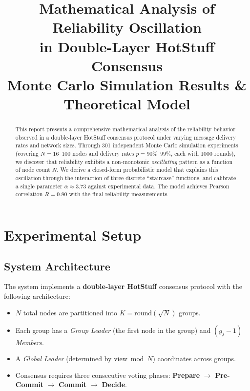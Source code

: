 \documentclass[12pt,a4paper]{article}
\title{%
  \textbf{Mathematical Analysis of Reliability Oscillation\\
  in Double-Layer HotStuff Consensus}\\[0.5em]
  \large Monte Carlo Simulation Results \& Theoretical Model
}
\author{}
\date{}
\begin{document}
\maketitle

\begin{abstract}
This report presents a comprehensive mathematical analysis of the reliability behavior observed in a double-layer HotStuff consensus protocol under varying message delivery rates and network sizes. Through 301 independent Monte Carlo simulation experiments (covering $N = 16$--$100$ nodes and delivery rates $p = 90\%$--$99\%$, each with 1000 rounds), we discover that reliability exhibits a non-monotonic \emph{oscillating} pattern as a function of node count $N$. We derive a closed-form probabilistic model that explains this oscillation through the interaction of three discrete ``staircase'' functions, and calibrate a single parameter $\alpha \approx 3.73$ against experimental data. The model achieves Pearson correlation $R = 0.80$ with the final reliability measurements.
\end{abstract}

\tableofcontents
\newpage

\section{Experimental Setup}

\subsection{System Architecture}

The system implements a \textbf{double-layer HotStuff} consensus protocol with the following architecture:

\begin{itemize}
  \item $N$ total nodes are partitioned into $K = \text{round}(\sqrt{N})$ groups.
  \item Each group has a \emph{Group Leader} (the first node in the group) and $(g_j - 1)$ \emph{Members}.
  \item A \emph{Global Leader} (determined by $\text{view} \bmod N$) coordinates across groups.
  \item Consensus requires three consecutive voting phases: \textbf{Prepare} $\to$ \textbf{Pre-Commit} $\to$ \textbf{Commit} $\to$ \textbf{Decide}.
\end{itemize}
\end{document}
